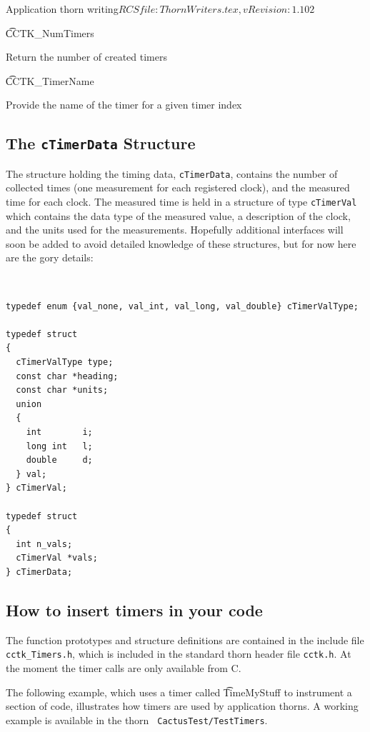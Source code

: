 \begin{cactuspart}{2}{Application thorn writing}{$RCSfile: ThornWriters.tex,v $}{$Revision: 1.102 $}
\begin{Lentry}
\item[{\t CCTK\_NumTimers}]

Return the number of created timers

\item[{\t CCTK\_TimerName}]

Provide the name of the timer for a given timer index

\end{Lentry}

\subsection{The {\tt cTimerData} Structure}

The structure holding the timing data, {\tt cTimerData}, contains
the number of collected times (one measurement for each registered clock),
and the measured time for each clock. The measured time is held in
a structure of type {\tt cTimerVal} which contains the data type
of the measured value, a description of the clock, and the units used
for the measurements. Hopefully additional interfaces will soon be added
to avoid detailed knowledge of these structures, but for now here are
the gory details:

{\tt
\begin{verbatim}
typedef enum {val_none, val_int, val_long, val_double} cTimerValType;

typedef struct
{
  cTimerValType type;
  const char *heading;
  const char *units;
  union
  {
    int        i;
    long int   l;
    double     d;
  } val;
} cTimerVal;

typedef struct
{
  int n_vals;
  cTimerVal *vals;
} cTimerData;
\end{verbatim}
}

\subsection{How to insert timers in your code}

The function prototypes and structure definitions are contained in the
include file {\tt cctk\_Timers.h}, which is included in the standard
thorn header file {\tt cctk.h}. At the moment the timer calls are only
available from C.

The following example, which uses a timer called {\t TimeMyStuff} to
instrument a section of code, illustrates how timers are used by
application thorns. A working example is available in the thorn {\tt
CactusTest/TestTimers}.


\end{cactuspart}
